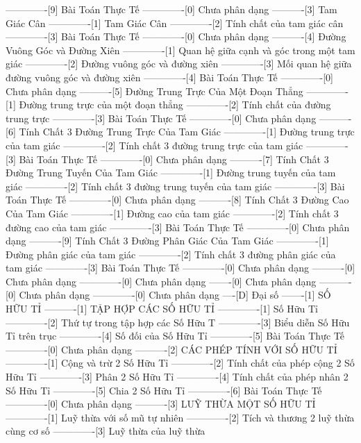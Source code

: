 -------------[9] Bài Toán Thực Tế
-------------[0] Chưa phân dạng
----------[3] Tam Giác Cân
-------------[1] Tam Giác Cân
-------------[2] Tính chất của tam giác cân
-------------[3] Bài Toán Thực Tế
-------------[0] Chưa phân dạng
----------[4] Đường Vuông Góc và Đường Xiên
-------------[1] Quan hệ giữa cạnh và góc trong một tam giác
-------------[2] Đường vuông góc và đường xiên
-------------[3] Mối quan hệ giữa đường vuông góc và đường xiên
-------------[4] Bài Toán Thực Tế
-------------[0] Chưa phân dạng
----------[5] Đường Trung Trực Của Một Đoạn Thẳng
-------------[1] Đường trung trực của một đoạn thẳng
-------------[2] Tính chất của đường trung trực
-------------[3] Bài Toán Thực Tế
-------------[0] Chưa phân dạng
----------[6] Tính Chất 3 Đường Trung Trực Của Tam Giác
-------------[1] Đường trung trực của tam giác
-------------[2] Tính chất 3 đường trung trực của tam giác
-------------[3] Bài Toán Thực Tế
-------------[0] Chưa phân dạng
----------[7] Tính Chất 3 Đường Trung Tuyến Của Tam Giác
-------------[1] Đường trung tuyến của tam giác
-------------[2] Tính chất 3 đường trung tuyến của tam giác
-------------[3] Bài Toán Thực Tế
-------------[0] Chưa phân dạng
----------[8] Tính Chất 3 Đường Cao Của Tam Giác
-------------[1] Đường cao của tam giác
-------------[2] Tính chất 3 đường cao của tam giác
-------------[3] Bài Toán Thực Tế
-------------[0] Chưa phân dạng
----------[9] Tính Chất 3 Đường Phân Giác Của Tam Giác
-------------[1] Đường phân giác của tam giác
-------------[2] Tính chất 3 đường phân giác của tam giác
-------------[3] Bài Toán Thực Tế
-------------[0] Chưa phân dạng
----------[0] Chưa phân dạng
-------------[0] Chưa phân dạng
-------[0] Chưa phân dạng
----------[0] Chưa phân dạng
-------------[0] Chưa phân dạng
----[D] Đại số
-------[1] SỐ HỮU TỈ
----------[1] TẬP HỢP CÁC SỐ HỮU TỈ 
-------------[1] Số Hữu Tỉ
-------------[2] Thứ tự trong tập hợp các Số Hữu T
-------------[3] Biểu diễn Số Hữu Tỉ trên trục
-------------[4] Số đối của Số Hữu Tỉ
-------------[5] Bài Toán Thực Tế
-------------[0] Chưa phân dạng
----------[2] CÁC PHÉP TÍNH VỚI SỐ HỮU TỈ
-------------[1] Cộng và trừ 2 Số Hữu Tỉ
-------------[2] Tính chất của phép cộng 2 Số Hữu Tỉ
-------------[3] Phân 2 Số Hữu Tỉ
-------------[4] Tính chất của phép nhân 2 Số Hữu Tỉ
-------------[5] Chia 2 Số Hữu Tỉ
-------------[6] Bài Toán Thực Tế
-------------[0] Chưa phân dạng
----------[3] LUỸ THỪA MỘT SỐ HỮU TỈ
-------------[1] Luỹ thừa với số mũ tự nhiên
-------------[2] Tích và thương 2 luỹ thừa cùng cơ số
-------------[3] Luỹ thừa của luỹ thừa

